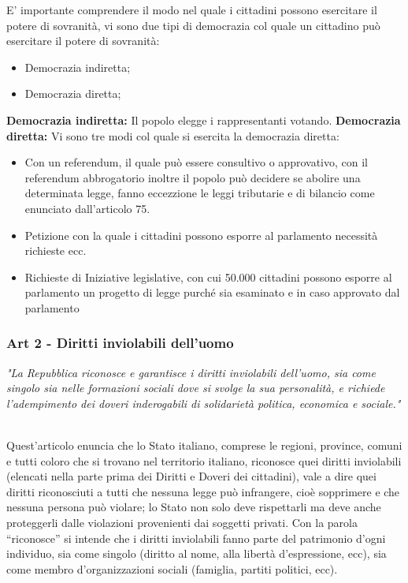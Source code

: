 \documentclass{report}
\begin{document}
E' importante comprendere il modo nel quale i cittadini possono esercitare il potere di sovranità, vi sono due tipi di democrazia col quale un cittadino può esercitare il potere di sovranità: 
\begin{itemize}
  \item Democrazia indiretta;
  \item Democrazia diretta;
\end{itemize}

\textbf{Democrazia indiretta:}
Il popolo elegge i rappresentanti votando.
\textbf{Democrazia diretta:}
Vi sono tre modi col quale si esercita la democrazia diretta:
\begin{itemize}
  \item Con un referendum, il quale può essere consultivo o approvativo, con il referendum abbrogatorio inoltre il popolo può decidere se abolire una determinata legge, fanno eccezzione le leggi tributarie e di bilancio come enunciato dall'articolo 75.
  \item Petizione con la quale i cittadini possono esporre al parlamento necessità richieste ecc. 
  \item Richieste di Iniziative legislative, con cui 50.000 cittadini possono esporre al parlamento un progetto di legge purché sia esaminato e in caso approvato dal parlamento
\end{itemize}

\subsubsection{Art 2 -  Diritti inviolabili dell'uomo}
\textit{"La Repubblica riconosce e garantisce i diritti inviolabili dell’uomo, sia come singolo sia nelle formazioni sociali
dove si svolge la sua personalità, e richiede l’adempimento dei doveri inderogabili di solidarietà politica, economica e
sociale."}

\\

Quest’articolo enuncia che lo Stato italiano, comprese le regioni, province, comuni e tutti coloro che si trovano nel
territorio italiano, riconosce quei diritti inviolabili (elencati nella parte prima dei Diritti e Doveri dei cittadini), vale a
dire quei diritti riconosciuti a tutti che nessuna legge può infrangere, cioè sopprimere e che nessuna persona può violare;
lo Stato non solo deve rispettarli ma deve anche proteggerli dalle violazioni provenienti dai soggetti privati. Con la
parola “riconosce” si intende che i diritti inviolabili fanno parte del patrimonio d’ogni individuo, sia come singolo
(diritto al nome, alla libertà d’espressione, ecc), sia come membro d’organizzazioni sociali (famiglia, partiti politici,
ecc). 
\end{document}

